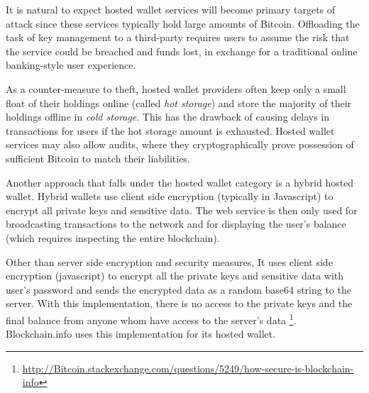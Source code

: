 It is natural to expect hosted wallet services will become primary targets of attack since these services typically hold large amounts of Bitcoin. Offloading the task of key management to a third-party requires users to assume the risk that the service could be breached and funds lost, in exchange for a traditional online banking-style user experience. 

As a counter-measure to theft, hosted wallet providers often keep only a small float of their holdings online (called \textit{hot storage}) and store the majority of their holdings offline in \textit{cold storage}. This has the drawback of causing delays in transactions for users if the hot storage amount is exhausted.
Hosted wallet services may also allow audits, where they cryptographically prove possession of sufficient Bitcoin to match their liabilities.  

Another approach that falls under the hosted wallet category is a hybrid hosted wallet. Hybrid wallets use client side encryption (typically in Javascript) to encrypt all private keys and sensitive data. The web service is then only used for broadcasting transactions to the network and for displaying the user's balance (which requires inspecting the entire blockchain).

Other than server side encryption and security measures, It uses client side encryption (javascript) to encrypt all the private keys and sensitive data with user's password and sends the encrypted data as a random base64 string to the server. With this implementation, there is no access to the private keys and the final balance from anyone whom have access to the server's data \footnote{\url{http://Bitcoin.stackexchange.com/questions/5249/how-secure-is-blockchain-info}}. Blockchain.info uses this implementation for its hosted wallet.



